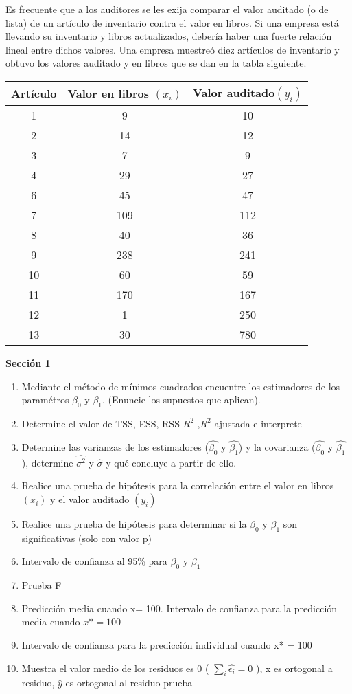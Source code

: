 \documentclass{../oxmathproblems}
\begin{document}
\begin{questions}

\miquestion Es frecuente que a los auditores se les exija comparar el valor auditado (o de lista) de un artículo de inventario contra el valor en libros. Si una empresa está llevando su inventario y libros actualizados, debería haber una fuerte relación lineal entre dichos valores. Una empresa muestreó diez artículos de inventario y obtuvo los valores auditado y en libros que se dan en la tabla siguiente. 

\begin{tabular}{|c|c|c|}
\hline
Artículo & Valor en libros $(x_i)$ & Valor auditado$(y_i)$ \\ \hline
1 & 9 & 10\\
2 & 14 & 12\\
3 & 7 & 9\\ 
4 & 29  & 27\\ 
6 & 45 & 47\\ 
7 & 109 & 112\\ 
8 & 40 & 36\\ 
9 & 238 & 241\\ 
10 & 60 & 59\\
11 & 170 & 167\\
12 & 1 & 250\\
13 & 30 & 780\\
\hline
\end{tabular}


\textbf {Sección 1} 

\begin{enumerate}
  \item Mediante el método de mínimos cuadrados encuentre los estimadores de los paramétros $\beta_0$ y $\beta_1$. (Enuncie los supuestos que aplican). 
  \item Determine el valor de TSS, ESS, RSS  $R^2$ ,$R^2$ ajustada   e interprete 
  \item Determine las varianzas de los estimadores ($\hat{\beta_0}$ y $\hat{\beta_1}$) y la covarianza  ($\hat{\beta_0}$ y $\hat{\beta_1}$), determine $\hat{\sigma^2}$ y $\hat{\sigma}$ y qué concluye a partir de ello.
  \item Realice una prueba de hipótesis para la correlación entre el valor en libros $(x_i)$ y el valor auditado $(y_i)$
  \item Realice una prueba de hipótesis para determinar si la  $\beta_0$ y $\beta_1$ son significativas (solo con valor p) 
  \item Intervalo de confianza al 95\% para $\beta_0$ y $\beta_1$ 
   \item Prueba F 
   \item Predicción media cuando x= 100. Intervalo de confianza para la predicción media cuando $x* = 100$
   \item Intervalo de confianza para la predicción individual cuando x* = 100
   \item Muestra el valor medio de los residuos es 0 ( $\sum_{i}\hat{\epsilon_i}=0$ ), x es ortogonal a residuo, $\hat{y}$  es ortogonal al residuo prueba 
\end{enumerate}





\end{questions}
\end{document}
